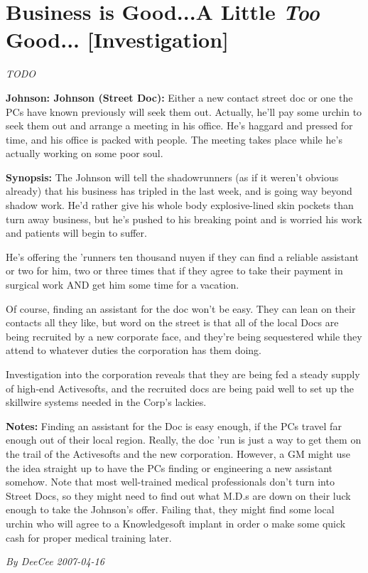 \documentclass[letterpaper,twocolumn,10.5pt]{article}
\newenvironment{scenario}[6]
	{
		\section{#1 {\small[#2]}}
		\textit{#3}
		\def\TMPSCENARIO{#4 #5}
	}
	{\small\textit{By \TMPSCENARIO}}
\newcommand{\johnson}[2]{\textbf{Johnson: #1 (#2):}}
\newcommand{\synopsis}{\textbf{Synopsis: }}
\newcommand{\notes}{\textbf{Notes: }}
\begin{document}
\begin{scenario}{Business is Good...A Little \textit{Too} Good...}
	{Investigation}
	{TODO}
	{DeeCee}
	{2007-04-16}
	{https://forum.rpg.net/showthread.php?321504-Shadowrun-4th-101-Instant-Scenarios\&p=7175545#post7175545}

\johnson{Johnson}{Street Doc} Either a new contact street doc or one the PCs have known previously will seek them out. Actually, he'll pay some urchin to seek them out and arrange a meeting in his office. He's haggard and pressed for time, and his office is packed with people. The meeting takes place while he's actually working on some poor soul.

\synopsis The Johnson will tell the shadowrunners (as if it weren't obvious already) that his business has tripled in the last week, and is going way beyond shadow work. He'd rather give his whole body explosive-lined skin pockets than turn away business, but he's pushed to his breaking point and is worried his work and patients will begin to suffer.

He's offering the 'runners ten thousand nuyen if they can find a reliable assistant or two for him, two or three times that if they agree to take their payment in surgical work AND get him some time for a vacation.

Of course, finding an assistant for the doc won't be easy. They can lean on their contacts all they like, but word on the street is that all of the local Docs are being recruited by a new corporate face, and they're being sequestered while they attend to whatever duties the corporation has them doing.

Investigation into the corporation reveals that they are being fed a steady supply of high-end Activesofts, and the recruited docs are being paid well to set up the skillwire systems needed in the Corp's lackies.

\notes Finding an assistant for the Doc is easy enough, if the PCs travel far enough out of their local region. Really, the doc 'run is just a way to get them on the trail of the Activesofts and the new corporation. However, a GM might use the idea straight up to have the PCs finding or engineering a new assistant somehow. Note that most well-trained medical professionals don't turn into Street Docs, so they might need to find out what M.D.s are down on their luck enough to take the Johnson's offer. Failing that, they might find some local urchin who will agree to a Knowledgesoft implant in order o make some quick cash for proper medical training later. 

\end{scenario}
\end{document}
